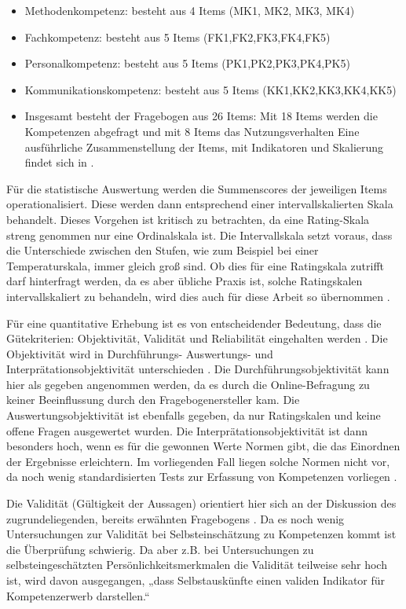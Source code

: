 \documentclass[12pt, bibliography=totoc]{scrartcl}
\begin{document}
\begin{itemize}
\tightlist
\item
  Methodenkompetenz: besteht aus 4 Items (MK1, MK2, MK3, MK4)
\item
  Fachkompetenz: besteht aus 5 Items (FK1,FK2,FK3,FK4,FK5)
\item
  Personalkompetenz: besteht aus 5 Items (PK1,PK2,PK3,PK4,PK5)
\item
  Kommunikationskompetenz: besteht aus 5 Items (KK1,KK2,KK3,KK4,KK5)
\item
  Insgesamt besteht der Fragebogen aus 26 Items: Mit 18 Items werden die
  Kompetenzen abgefragt und mit 8 Items das Nutzungsverhalten Eine
  ausführliche Zusammenstellung der Items, mit Indikatoren und
  Skalierung findet sich in .
\end{itemize}

Für die statistische Auswertung werden die Summenscores der jeweiligen
Items operationalisiert. Diese werden dann entsprechend einer
intervallskalierten Skala behandelt. Dieses Vorgehen ist kritisch zu
betrachten, da eine Rating-Skala streng genommen nur eine Ordinalskala
ist. Die Intervallskala setzt voraus, dass die Unterschiede zwischen den
Stufen, wie zum Beispiel bei einer Temperaturskala, immer gleich groß
sind. Ob dies für eine Ratingskala zutrifft darf hinterfragt werden, da
es aber übliche Praxis ist, solche Ratingskalen intervallskaliert zu
behandeln, wird dies auch für diese Arbeit so übernommen
\parencite[65]{Sedlmeier2013}.

Für eine quantitative Erhebung ist es von entscheidender Bedeutung, dass
die Gütekriterien: Objektivität, Validität und Reliabilität eingehalten
werden \parencite[104]{Hader2015}. Die Objektivität wird in
Durchführungs- Auswertungs- und Interprätationsobjektivität
unterschieden \parencite[70]{Sedlmeier2013}. Die
Durchführungsobjektivität kann hier als gegeben angenommen werden, da es
durch die Online-Befragung zu keiner Beeinflussung durch den
Fragebogenersteller kam. Die Auswertungsobjektivität ist ebenfalls
gegeben, da nur Ratingskalen und keine offene Fragen ausgewertet wurden.
Die Interprätationsobjektivität ist dann besonders hoch, wenn es für die
gewonnen Werte Normen gibt, die das Einordnen der Ergebnisse
erleichtern. Im vorliegenden Fall liegen solche Normen nicht vor, da
noch wenig standardisierten Tests zur Erfassung von Kompetenzen
vorliegen \parencite{Braun2008}.

Die Validität (Gültigkeit der Aussagen) orientiert hier sich an der
Diskussion des zugrundeliegenden, bereits erwähnten Fragebogens
\parencite{Braun2008}. Da es noch wenig Untersuchungen zur Validität bei
Selbsteinschätzung zu Kompetenzen kommt ist die Überprüfung schwierig.
Da aber z.B. bei Untersuchungen zu selbsteingeschätzten
Persönlichkeitsmerkmalen die Validität teilweise sehr hoch ist, wird
davon ausgegangen, „dass Selbstauskünfte einen validen Indikator für
Kompetenzerwerb darstellen.`` \parencite[32]{Braun2008}
\end{document}

